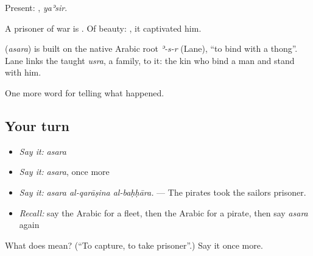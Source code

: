 Present: , \emph{yaʾsir}.

A prisoner of war is . Of beauty:  , it captivated him.

\begin{cousinweb}
\textbf{} (\emph{asara}) is built on the native Arabic root \emph{ʾ-s-r} (Lane), \textquotedblleft{}to bind with a thong\textquotedblright{}. Lane links the taught \emph{usra}, a family, to it: the kin who bind a man and stand with him.
\end{cousinweb}

\begin{grammarlens}[title={What you've built}]
One more word for telling what happened.
\end{grammarlens}

\subsection*{Your turn}
\begin{itemize}
\raggedright
  \item \emph{Say it:} \emph{asara}
  \item \emph{Say it:} \emph{asara}, once more
  \item \emph{Say it:} \emph{asara al-qarāṣina al-baḥḥāra.} — The pirates took the sailors prisoner.
  \item \emph{Recall:} say the Arabic for a fleet, then the Arabic for a pirate, then say \emph{asara} again
\end{itemize}

\begin{tcolorbox}[breakable,colback=teal!4,colframe=teal!35!black,title={Before you move on}]
What does  mean? (\textquotedblleft{}To capture, to take prisoner\textquotedblright{}.) Say it once more.
\end{tcolorbox}
